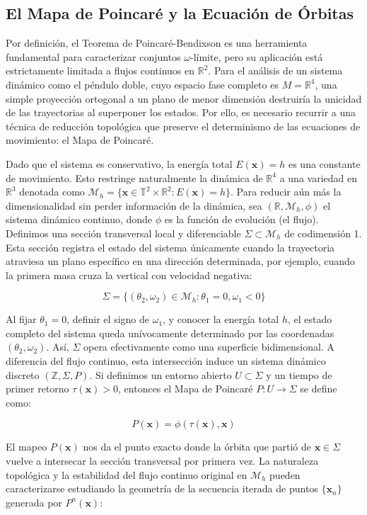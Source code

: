 \documentclass[13pt]{extarticle}
\begin{document}
\subsection{El Mapa de Poincaré y la Ecuación de Órbitas}

Por definición, el Teorema de Poincaré-Bendixson es una herramienta fundamental para caracterizar conjuntos $\omega$-límite, pero su aplicación está estrictamente limitada a flujos continuos en $\mathbb{R}^2$. Para el análisis de un sistema dinámico como el péndulo doble, cuyo espacio fase completo es $M = \mathbb{R}^4$, una simple proyección ortogonal a un plano de menor dimensión destruiría la unicidad de las trayectorias al superponer los estados. Por ello, es necesario recurrir a una técnica de reducción topológica que preserve el determinismo de las ecuaciones de movimiento: el Mapa de Poincaré.

Dado que el sistema es conservativo, la energía total $E(\mathbf{x}) = h$ es una constante de movimiento. Esto restringe naturalmente la dinámica de $\mathbb{R}^4$ a una variedad en $\mathbb{R}^3$ denotada como $ \mathcal{M}_{h} = \{ \mathbf{x} \in \mathbb{T}^2 \times \mathbb{R}^2 : E(\mathbf{x}) = h \}$. Para reducir aún más la dimensionalidad sin perder información de la dinámica, sea $(\mathbb{R}, \mathcal{M}_h, \phi)$ el sistema dinámico continuo, donde $\phi$ es la función de evolución (el flujo). Definimos una sección transversal local y diferenciable $\Sigma \subset \mathcal{M}_{h}$ de codimensión 1. Esta sección registra el estado del sistema únicamente cuando la trayectoria atraviesa un plano específico en una dirección determinada, por ejemplo, cuando la primera masa cruza la vertical con velocidad negativa:

\[
\Sigma = \{ (\theta_2, \omega_2) \in \mathcal{M}_{h} : \theta_1 = 0, \omega_1 < 0 \}
\]

Al fijar $\theta_1 = 0$, definir el signo de $\omega_1$, y conocer la energía total $h$, el estado completo del sistema queda unívocamente determinado por las coordenadas $(\theta_2, \omega_2)$. Así, $\Sigma$ opera efectivamente como una superficie bidimensional. A diferencia del flujo continuo, esta intersección induce un sistema dinámico discreto $(\mathbb{Z}, \Sigma, P)$. Si definimos un entorno abierto $U \subset \Sigma$ y un tiempo de primer retorno $\tau(\mathbf{x}) > 0$, entonces el Mapa de Poincaré $P: U \to \Sigma$ se define como:

\[
P(\mathbf{x}) = \phi(\tau(\mathbf{x}), \mathbf{x})
\]

El mapeo $P(\mathbf{x})$ nos da el punto exacto donde la órbita que partió de $\mathbf{x} \in \Sigma$ vuelve a intersecar la sección transversal por primera vez. La naturaleza topológica y la estabilidad del flujo continuo original en $\mathcal{M}_h$ pueden caracterizarse estudiando la geometría de la secuencia iterada de puntos $\{ \mathbf{x}_n \}$ generada por $P^n(\mathbf{x})$:
\end{document}

